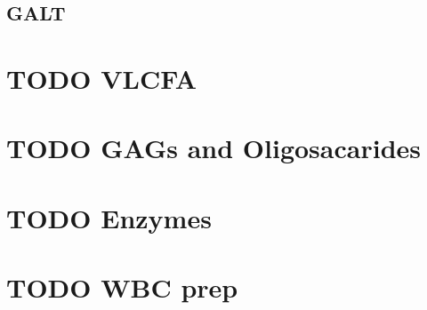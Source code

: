 \documentclass{scrartcl}
\begin{document}
\subsection{GALT}
\label{sec:orgf200c58}

\section{{\bfseries\sffamily TODO} VLCFA}
\label{sec:orged9d035}
\section{{\bfseries\sffamily TODO} GAGs and Oligosacarides}
\label{sec:org92814f0}
\section{{\bfseries\sffamily TODO} Enzymes}
\label{sec:org7b62c7f}
\section{{\bfseries\sffamily TODO} WBC prep}
\label{sec:org17cbbca}
\end{document}
